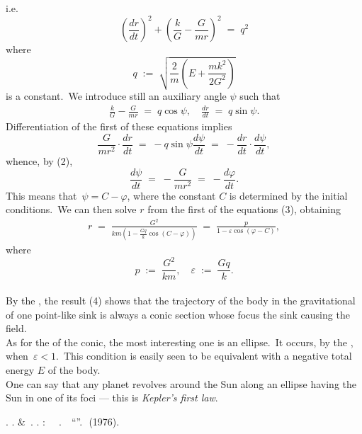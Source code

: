 \documentclass[12pt]{article}
\begin{document}
i.e. 
$$\left(\frac{dr}{dt}\right)^2\!+\left(\frac{k}{G}-\frac{G}{mr}\right)^2 \;=\; q^2$$
where
$$q \;:=\; \sqrt{\frac{2}{m}\left(\!E\!+\!\frac{mk^2}{2G^2}\right)}$$
is a constant.\, We introduce still an auxiliary angle $\psi$ such that
\begin{align}
\frac{k}{G}-\frac{G}{mr} \;=\; q\cos\psi, \quad \frac{dr}{dt} \;=\; q\sin\psi.
\end{align}
Differentiation of the first of these equations implies
$$\frac{G}{mr^2}\cdot\frac{dr}{dt} \;=\; -q\sin\psi\frac{d\psi}{dt} \;=\; -\frac{dr}{dt}\cdot\frac{d\psi}{dt},$$
whence, by (2),
$$\frac{d\psi}{dt} \;=\; -\frac{G}{mr^2} \;=\; -\frac{d\varphi}{dt}.$$
This means that\, $\psi = C\!-\!\varphi$, where the constant $C$ is determined by the initial conditions.\, We can then solve $r$ from the first of the equations (3), obtaining
\begin{align}
r \;=\; \frac{G^2}{km\left(1-\frac{Gq}{k}\cos(C-\varphi)\right)} \;=\; \frac{p}{1-\varepsilon\cos(\varphi-C)},
\end{align}
where
$$p \;:=\; \frac{G^2}{km}, \quad \varepsilon \;:=\; \frac{Gq}{k}.$$\\

By the , the result (4) shows that the trajectory of the body in the gravitational  of one point-like sink is always a conic section whose focus  the sink causing the field.\\

As for the  of the conic, the most interesting one is an ellipse.\, It occurs, by the 
, when\, $\varepsilon < 1$.\, This condition is easily seen to be equivalent with a negative total energy $E$ of the body.\\

One can say that any planet revolves around the Sun along an ellipse having the Sun in one of its foci --- this is \emph{Kepler's first law}.



\begin{thebibliography}{9}
 \CYRYA. \CYRB. \CYRZ\cyre\cyrl\cyrsftsn\cyrd\cyro\cyrv\cyri\cyrch \;\&\, \CYRA. \CYRD. \CYRM\cyrery\cyrsh\cyrk\cyri\cyrs: 
{\em \CYREREV\cyrl\cyre\cyrm\cyre\cyrn\cyrt\cyrery\, \cyrp\cyrr\cyri\cyrk\cyrl\cyra\cyrd\cyrn\cyro\cyrishrt\, \cyrm\cyra\cyrt\cyre\cyrm\cyra\cyrt\cyri\cyrk\cyri}. \,\CYRI\cyrz\cyrd\cyra\cyrt\cyre\cyrl\cyrsftsn\cyrs\cyrt\cyrv\cyro \,
``\CYRN\cyra\cyru\cyrk\cyra''.\, \CYRM\cyro\cyrs\cyrk\cyrv\cyra \,(1976).

\end{thebibliography}
\end{document}
